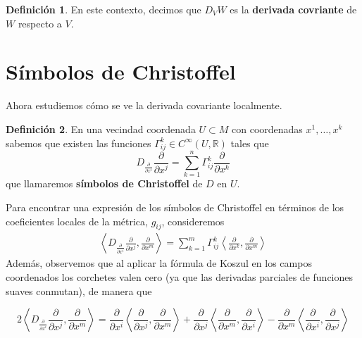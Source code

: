 \documentclass[spanish]{book}
\theoremstyle{definition}
\newtheorem*{defn}{Definición}
\newcommand{\R}{\mathbb{R}}
\newcommand{\Cinf}{C^\infty}
\begin{document}
	\begin{defn}
		En este contexto, decimos que $D_VW$ es la \textbf{derivada covriante} de $W$ respecto a $V$.
	\end{defn}
	\section{Símbolos de Christoffel}
	Ahora estudiemos cómo se ve la derivada covariante localmente.
	\begin{defn}
		En una vecindad coordenada $U\subset M$ con coordenadas $x^1,\ldots,x^k$ sabemos que existen las funciones $\Gamma^k_{ij}\in\Cinf(U,\R)$ tales que
		\[D_{\frac{\partial}{\partial x^i}}\frac{\partial}{\partial x^j}=\sum_{k=1}^n\Gamma^k_{ij}\frac{\partial}{\partial x^k}\]
		que llamaremos \textbf{símbolos de Christoffel} de $D$ en $U$.
	\end{defn}
	Para encontrar una expresión de los símbolos de Christoffel en términos de los coeficientes locales de la métrica, $g_{ij}$, consideremos 
	\begin{align*}
		\left\langle D_{\frac{\partial}{\partial x^i}}\frac{\partial}{\partial x^j},\frac{\partial}{\partial x^m}\right\rangle=\sum_{k=1}^m\Gamma_{ij}^k\left\langle\frac{\partial}{\partial x^k},\frac{\partial}{\partial x^m}\right\rangle
	\end{align*}
	Además, observemos que al aplicar la fórmula de Koszul en los campos coordenados los corchetes valen cero (ya que las derivadas parciales de funciones suaves conmutan), de manera que

	\begin{equation}\label{eq:kozszul-coords}
		2\left\langle D_{\frac{\partial}{\partial x^i}}\frac{\partial}{\partial x^j},\frac{\partial}{\partial x^m}\right\rangle=\frac{\partial}{\partial x^i}\left\langle \frac{\partial}{\partial x^j},\frac{\partial}{\partial x^m}\right\rangle+\frac{\partial}{\partial x^j}\left\langle \frac{\partial}{\partial x^m},\frac{\partial}{\partial x^i}\right\rangle-\frac{\partial}{\partial x^m}\left\langle \frac{\partial}{\partial x^i},\frac{\partial}{\partial x^j}\right\rangle
	\end{equation}
	
\end{document}
